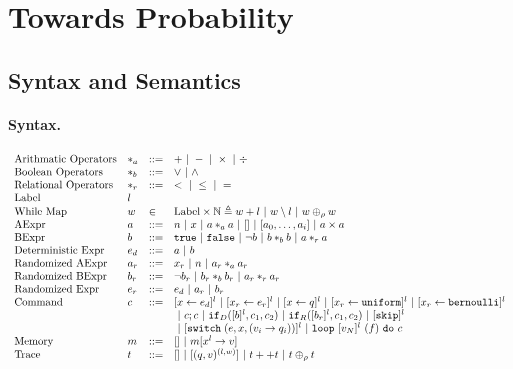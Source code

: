 \documentclass[a4paper,11pt]{article}
\begin{document}
\section{Towards Probability}
%
\subsection{Syntax and Semantics}
%
\paragraph{Syntax.}
\[
\begin{array}{llll}
 \mbox{Arithmatic Operators} & *_a & ::= & + ~|~ - ~|~ \times 
%
~|~ \div \\  
  \mbox{Boolean Operators} & *_b & ::= & \lor \sep \land \\
   \mbox{Relational Operators} & *_r & ::= & < ~|~ \leq ~|~ = \\  
 \mbox{Label} & l & & \\ 
 \mbox{While Map} & w & \in & \mbox{Label} \times \mathbb{N} \triangleq w +l \sep w \setminus l \sep w \oplus_\rho w \\
\mbox{AExpr} & \aexpr & ::= & 
	n ~|~ x ~|~ \aexpr *_a \aexpr ~|~ {[] ~|~ [\aexpr_0, \dots, \aexpr_i] \sep \aexpr \times \aexpr } \\
\mbox{BExpr} & \bexpr & ::= & 
	\etrue ~|~ \efalse  ~|~ \neg \bexpr
	 ~|~ \bexpr *_b \bexpr
	~|~ \aexpr *_r \aexpr \\
\mbox{Deterministic Expr} & \expr_d & ::=	& \aexpr \sep \bexpr \\
\mbox{Randomized AExpr} & \aexpr_r & ::= & 
	 x_r \sep n \sep  \aexpr_r *_a \aexpr_r \\
\mbox{Randomized BExpr} & \bexpr_r & ::= & 
\neg \bexpr_r
	 ~|~ \bexpr_r *_b \bexpr_r
	~|~ \aexpr_r *_r \aexpr_r \\
\mbox{Randomized Expr} & \expr_r & ::=	& \expr_d \sep \aexpr_r \sep \bexpr_r \\
\mbox{Command} & \command & ::= &   [\assign x {\expr_d}]^{l} \sep [\assign {x_r} {\expr_r}]^{l} \sep  [\assign x q]^{l} \sep  [\assign {x_r} \uniform ]^{l} \sep   [\assign {x_r} \bernoulli]^{l} 
\\
& & & ~|~  \command ; \command  ~|~ \eif_D ([\bexpr]^{l}, \command_1, \command_2) \sep  \eif_R ([\bexpr_r]^{l}, \command_1, \command_2) 
 ~|~ [\eskip]^{l} \\
& & & { \sep [\eswitch( \expr, x, (v_i \to  q_i))]^{l}} \sep {\eloop ~ [\valr_N]^{l} ~ (f) ~ \edo ~ \command }
	\\
\mbox{Memory} & m & ::= & [] ~|~ m[x^{l} \to v] \\
%
\mbox{Trace} & t & ::= & [] ~|~ [(q, v)^{(l, w) }] ~|~ t ++ t 
~|~ t \oplus_{\rho} t
\end{array}
\]
\end{document}
